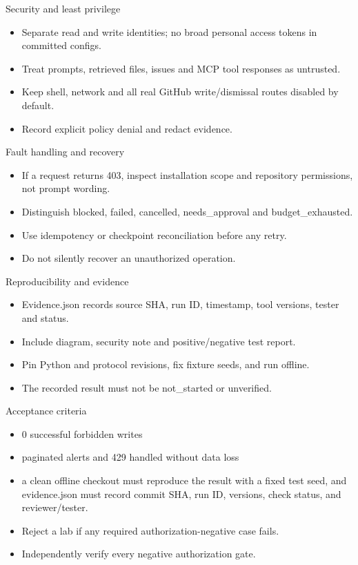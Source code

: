 \documentclass[aspectratio=169,10pt]{beamer}
\begin{document}
\begin{frame}{Security and least privilege}
\small
\begin{itemize}
\item Separate read and write identities; no broad personal access tokens in committed configs.
\item Treat prompts, retrieved files, issues and MCP tool responses as untrusted.
\item Keep shell, network and all real GitHub write/dismissal routes disabled by default.
\item Record explicit policy denial and redact evidence.
\end{itemize}

\end{frame}

\begin{frame}{Fault handling and recovery}
\small
\begin{itemize}
\item If a request returns 403, inspect installation scope and repository permissions, not prompt wording.
\item Distinguish blocked, failed, cancelled, needs\_approval and budget\_exhausted.
\item Use idempotency or checkpoint reconciliation before any retry.
\item Do not silently recover an unauthorized operation.
\end{itemize}

\end{frame}

\begin{frame}{Reproducibility and evidence}
\small
\begin{itemize}
\item Evidence.json records source SHA, run ID, timestamp, tool versions, tester and status.
\item Include diagram, security note and positive/negative test report.
\item Pin Python and protocol revisions, fix fixture seeds, and run offline.
\item The recorded result must not be not\_started or unverified.
\end{itemize}

\end{frame}

\begin{frame}{Acceptance criteria}
\small
\begin{itemize}
\item 0 successful forbidden writes
\item paginated alerts and 429 handled without data loss
\item a clean offline checkout must reproduce the result with a fixed test seed, and evidence.json must record commit SHA, run ID, versions, check status, and reviewer/tester.
\item Reject a lab if any required authorization-negative case fails.
\item Independently verify every negative authorization gate.
\end{itemize}

\end{frame}
\end{document}

